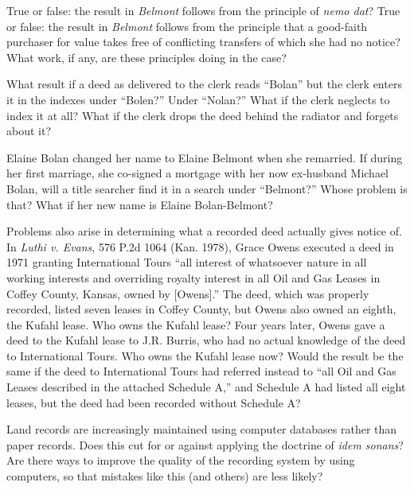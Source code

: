 
\item True or false: the result in \textit{Belmont} follows from the principle
of \textit{nemo dat}? True or false: the result in \textit{Belmont} follows
from the principle that a good-faith purchaser for value takes free of
conflicting transfers of which she had no notice? What work, if any, are these
principles doing in the case?


\item What result if a deed as delivered to the clerk reads ``Bolan'' but the
clerk enters it in the indexes under ``Bolen?'' Under ``Nolan?'' What if the
clerk neglects to index it at all? What if the clerk drops the deed behind the
radiator and forgets about it?


\item Elaine Bolan changed her name to Elaine Belmont when she remarried. If
during her first marriage, she co-signed a mortgage with her now ex-husband
Michael Bolan, will a title searcher find it in a search under ``Belmont?''
Whose problem is that? What if her new name is Elaine Bolan-Belmont?


\item Problems also arise in determining what a recorded deed actually gives
notice of. In \textit{Luthi v. Evans}, 576 P.2d 1064 (Kan. 1978), Grace Owens
executed a deed in 1971 granting International Tours {}``all interest of
whatsoever nature in all working interests and overriding royalty interest in
all Oil and Gas Leases in Coffey County, Kansas, owned by [Owens].'' The deed,
which was properly recorded, listed seven leases in Coffey County, but Owens
also owned an eighth, the Kufahl lease. Who owns the Kufahl lease? Four years
later, Owens gave a deed to the Kufahl lease to J.R. Burris, who had no actual
knowledge of the deed to International Tours. Who owns the Kufahl lease now?
Would the result be the same if the deed to International Tours had referred
instead to ``all Oil and Gas Leases described in the attached Schedule A,'' and
Schedule A had listed all eight leases, but the deed had been recorded without
Schedule A?


\item Land records are increasingly maintained using computer databases rather
than paper records. Does this cut for or against applying the doctrine of
\textit{idem sonans}? Are there ways to improve the quality of the recording
system by using computers, so that mistakes like this (and others) are less
likely?


